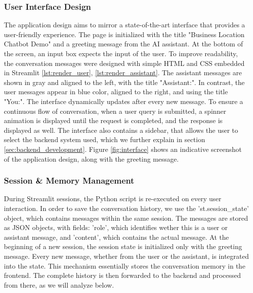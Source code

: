 \subsubsection{User Interface Design}

The application design aims to mirror a state-of-the-art interface that provides a user-friendly experience. The page is initialized with the title "Business Location Chatbot Demo" and a greeting message from the AI assistant. At the bottom of the screen, an input box expects the input of the user. To improve readability, the conversation messages were designed with simple HTML and CSS embedded in Streamlit \ref{lst:render_user}, \ref{lst:render_assistant}. The assistant messages are shown in gray and aligned to the left, with the title "Assistant:". In contrast, the user messages appear in blue color, aligned to the right, and using the title  "You:". The interface dynamically updates after every new message. To ensure a continuous flow of conversation, when a user query is submitted, a spinner animation is displayed until the request is completed, and the response is displayed as well. The interface also contains a sidebar, that allows the user to select the backend system used, which we further explain in section \ref{sec:backend_development}. Figure \ref{fig:interface} shows an indicative screenshot of the application design, along with the greeting message.


\subsubsection{Session \& Memory Management}

During Streamlit sessions, the Python script is re-executed on every user interaction. In order to save the conversation history, we use the 'st.session\_state' object, which contains messages within the same session. The messages are stored as JSON objects, with fields: 'role', which identifies wether this is a user or assistant message, and 'content', which contains the actual message. At the beginning of a new session, the session state is initialized only with the greeting message. Every new message, whether from the user or the assistant, is integrated into the state. This mechanism essentially stores the conversation memory in the frontend. The complete history is then forwarded to the backend and processed from there, as we will analyze below.



